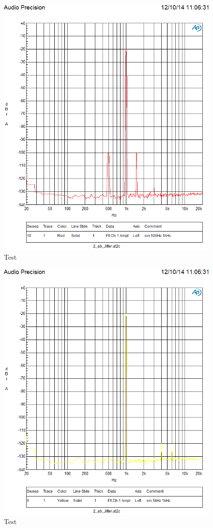 \begin{figure}[h!]
\centering
\includegraphics[width=\columnwidth]{figures/Aufg2/10.PNG} 
\caption{Test}
\end{figure}

\begin{figure}[h!]
\centering
\includegraphics[width=\columnwidth]{figures/Aufg2/9.PNG} 
\caption{Test}
\end{figure}

